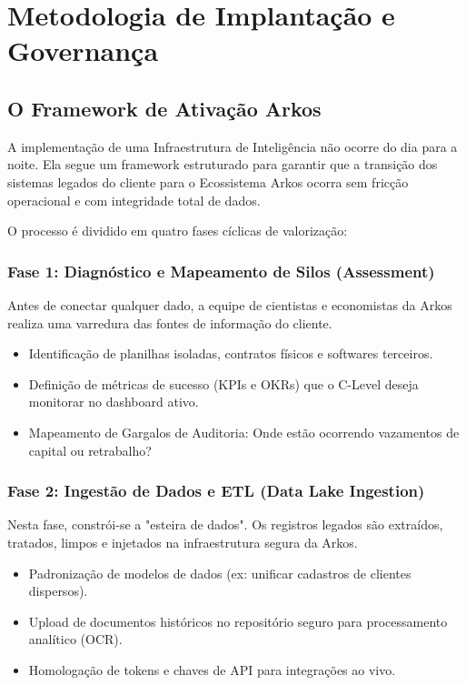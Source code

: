 \pagebreak
\chapter{Metodologia de Implantação e Governança}

\section{O Framework de Ativação Arkos}
A implementação de uma Infraestrutura de Inteligência não ocorre do dia para a noite. Ela segue um framework estruturado para garantir que a transição dos sistemas legados do cliente para o Ecossistema Arkos ocorra sem fricção operacional e com integridade total de dados.

O processo é dividido em quatro fases cíclicas de valorização:

\subsection{Fase 1: Diagnóstico e Mapeamento de Silos (Assessment)}
Antes de conectar qualquer dado, a equipe de cientistas e economistas da Arkos realiza uma varredura das fontes de informação do cliente.
\begin{itemize}
    \item Identificação de planilhas isoladas, contratos físicos e softwares terceiros.
    \item Definição de métricas de sucesso (KPIs e OKRs) que o C-Level deseja monitorar no dashboard ativo.
    \item Mapeamento de Gargalos de Auditoria: Onde estão ocorrendo vazamentos de capital ou retrabalho?
\end{itemize}

\subsection{Fase 2: Ingestão de Dados e ETL (Data Lake Ingestion)}
Nesta fase, constrói-se a "esteira de dados". Os registros legados são extraídos, tratados, limpos e injetados na infraestrutura segura da Arkos.
\begin{itemize}
    \item Padronização de modelos de dados (ex: unificar cadastros de clientes dispersos).
    \item Upload de documentos históricos no repositório seguro para processamento analítico (OCR).
    \item Homologação de tokens e chaves de API para integrações ao vivo.
\end{itemize}

